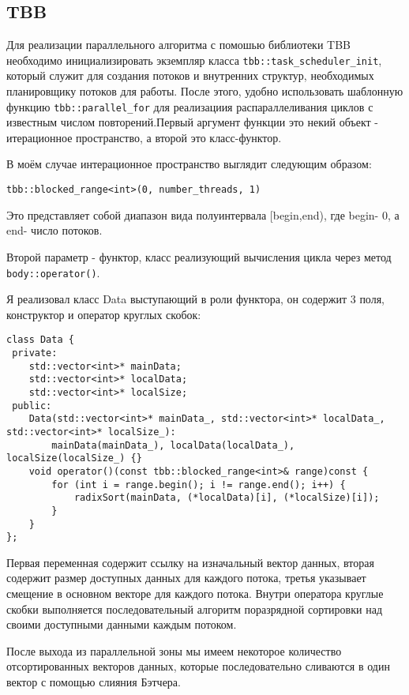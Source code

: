 \documentclass{report}
\begin{document}
\subsection*{TBB}
\par Для реализации параллельного алгоритма с помошью библиотеки TBB необходимо инициализировать экземпляр класса \verb|tbb::task_scheduler_init|, который служит для создания потоков и внутренних структур, необходимых планировщику потоков для работы. После этого, удобно использовать шаблонную функцию \verb|tbb::parallel_for| для реализациия распараллеливания циклов с известным числом повторений.Первый аргумент функции это некий объект - итерационное пространство, а второй это класс-функтор.
\par В моём случае интерационное пространство выглядит следующим образом:
\begin{lstlisting}
tbb::blocked_range<int>(0, number_threads, 1)
\end{lstlisting}
\par Это представляет собой диапазон вида полуинтервала [begin,end), где begin- 0, а end- число потоков.
\par Второй параметр - функтор, класс реализующий вычисления цикла через метод \verb|body::operator()|.
\par Я реализовал класс Data выступающий в роли функтора, он содержит 3 поля, конструктор и оператор круглых скобок:
\begin{lstlisting}
class Data {
 private:
    std::vector<int>* mainData;
    std::vector<int>* localData;
    std::vector<int>* localSize;
 public:
    Data(std::vector<int>* mainData_, std::vector<int>* localData_, std::vector<int>* localSize_):
        mainData(mainData_), localData(localData_), localSize(localSize_) {}
    void operator()(const tbb::blocked_range<int>& range)const {
        for (int i = range.begin(); i != range.end(); i++) {
            radixSort(mainData, (*localData)[i], (*localSize)[i]);
        }
    }
};
\end{lstlisting}
\par Первая переменная содержит ссылку на изначальный вектор данных, вторая содержит размер доступных данных для каждого потока, третья указывает смещение в основном векторе для каждого потока. Внутри оператора круглые скобки выполняется последовательный алгоритм поразрядной сортировки над своими доступными данными каждым потоком.
\par После выхода из параллельной зоны мы имеем некоторое количество отсортированных векторов данных, которые последовательно сливаются в один вектор с помощью слияния Бэтчера.
\end{document}
